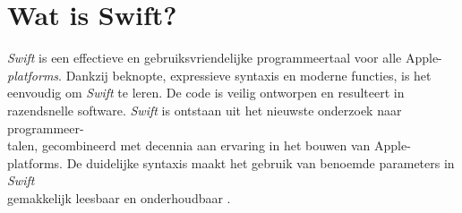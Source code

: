 \section{Wat is Swift?}

\textit{Swift} is een effectieve en gebruiksvriendelijke programmeertaal voor alle Apple-\textit{platforms}. Dankzij beknopte, expressieve syntaxis en moderne functies, is het \\eenvoudig om \textit{Swift} te leren. De code is veilig ontworpen en resulteert in razendsnelle software. 
\textit{Swift} is ontstaan uit het nieuwste onderzoek naar programmeer-\\talen, gecombineerd met decennia aan ervaring in het bouwen van Apple-platforms. De duidelijke syntaxis maakt het gebruik van benoemde parameters in \textit{Swift} \\gemakkelijk leesbaar en onderhoudbaar \autocite{Swift}.  \\

